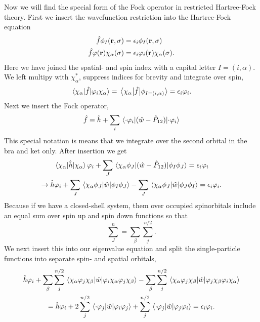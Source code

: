 Now we will find the special form of the Fock operator in restricted 
Hartree-Fock theory. First we insert the wavefunction restriction into 
the Hartree-Fock equation
\begin{equation}
    \begin{aligned}
        \hat{f}\phi_I(\vb{r}, \sigma) &= \epsilon_i \phi_I(\vb{r}, \sigma) \\
        \hat{f}\varphi(\vb{r}) \chi_\alpha(\sigma)
        &= \epsilon_i \varphi_i(\vb{r})\chi_\alpha(\sigma).
    \end{aligned}
\end{equation}
Here we have joined the spatial- and spin index with a capital letter $I = (i, \alpha)$.
We left multipy with $\chi_\alpha^*$, suppress indices for brevity and integrate over spin,
\begin{equation}
    \mel{\chi_\alpha}{\hat{f}}{\varphi_i\chi_\alpha}
    = \mel{\chi_\alpha}{\hat{f}}{\phi_{I = (i,\alpha)}}
    = \epsilon_i\varphi_i.
\end{equation}
Next we insert the Fock operator,
\begin{equation*}
    \hat{f} = \hat{h} + \sum_i\mel{\cdot\varphi_i}{(\hat{w} - \hat{P}_{12})}{\cdot\varphi_i}
\end{equation*} 
This special notation is means that we integrate over the second orbital in 
the bra and ket only. After insertion we get
\begin{equation}
   \begin{gathered}
        \mel{\chi_\alpha}{\hat{h}}{\chi_\alpha}\varphi_i
        + \sum_J \mel{\chi_\alpha\phi_J}{(\hat{w} - \hat{P}_{12})}{\phi_I\phi_J}
        = \epsilon_i\varphi_i \\
        \to\hat{h}\varphi_i 
        + \sum_J \mel{\chi_\alpha\phi_J}{\hat{w}}{\phi_I\phi_J}
        - \sum_J \mel{\chi_\alpha\phi_J}{\hat{w}}{\phi_J\phi_I}
        = \epsilon_i\varphi_i.
   \end{gathered} 
\end{equation}
Because if we have a closed-shell system, them over occupied spinorbitals include an 
equal sum over spin up and spin down functions so that
\begin{equation*}
    \sum_J^n = \sum_\beta\sum_j^{n/2}.
\end{equation*} 
We next insert this into our eigenvalue equation and split the single-particle functions 
into separate spin- and spatial orbitals,
\begin{equation}
    \begin{gathered}
        \hat{h}\varphi_i 
        + \sum_\beta\sum_j^{n/2}
            \mel{\chi_\alpha\varphi_j\chi_\beta}{\hat{w}}{\varphi_i\chi_\alpha\varphi_j\chi_\beta} 
        - \sum_\beta\sum_j^{n/2}
            \mel{\chi_\alpha\varphi_j\chi_\beta}{\hat{w}}{\varphi_j\chi_\beta\varphi_i\chi_\alpha} \\
        = \hat{h}\varphi_i 
        + 2\sum_j^{n/2} \mel{\cdot \varphi_j}{\hat{w}}{\varphi_i\varphi_j}
        +  \sum_j^{n/2} \mel{\cdot \varphi_j}{\hat{w}}{\varphi_j\varphi_i}
        = \epsilon_i\varphi_i.
    \end{gathered}
\end{equation}
